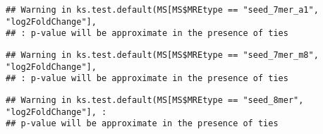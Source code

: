 \documentclass[
]{article}
\newenvironment{Shaded}{\begin{snugshade}}{\end{snugshade}}
\newcommand{\FunctionTok}[1]{\textcolor[rgb]{0.13,0.29,0.53}{\textbf{#1}}}
\newcommand{\NormalTok}[1]{#1}
\newcommand{\OtherTok}[1]{\textcolor[rgb]{0.56,0.35,0.01}{#1}}
\newcommand{\SpecialCharTok}[1]{\textcolor[rgb]{0.81,0.36,0.00}{\textbf{#1}}}
\newcommand{\StringTok}[1]{\textcolor[rgb]{0.31,0.60,0.02}{#1}}
\begin{document}
\begin{Shaded}
\end{Shaded}

\begin{verbatim}
## Warning in ks.test.default(MS[MS$MREtype == "seed_7mer_a1", "log2FoldChange"],
## : p-value will be approximate in the presence of ties
\end{verbatim}

\begin{Shaded}
\end{Shaded}

\begin{verbatim}
## Warning in ks.test.default(MS[MS$MREtype == "seed_7mer_m8", "log2FoldChange"],
## : p-value will be approximate in the presence of ties
\end{verbatim}

\begin{Shaded}
\end{Shaded}

\begin{verbatim}
## Warning in ks.test.default(MS[MS$MREtype == "seed_8mer", "log2FoldChange"], :
## p-value will be approximate in the presence of ties
\end{verbatim}
\end{document}
